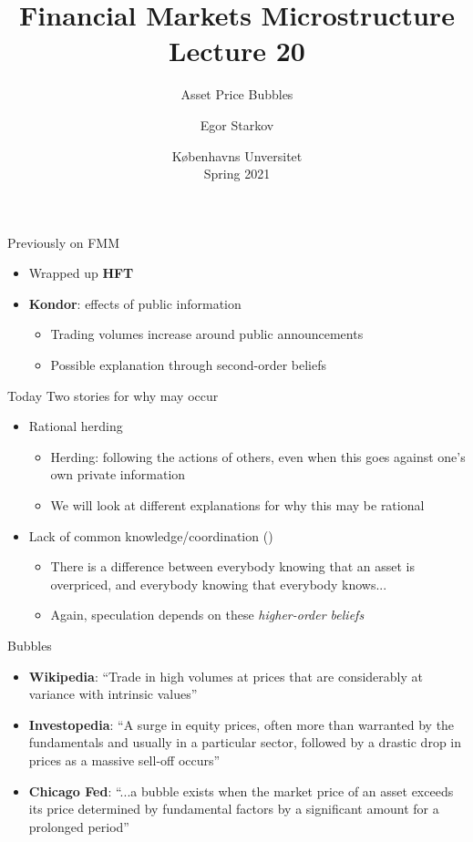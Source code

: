 \documentclass[english,10pt
,aspectratio=169
]{beamer}
\title{Financial Markets Microstructure \\ Lecture 20}
\subtitle{Asset Price Bubbles}
\author{Egor Starkov}
\date{K{\o}benhavns Unversitet \\
	Spring 2021}
\begin{document}
	\frame[plain]{\titlepage}



\begin{frame}{Previously on FMM}
	\begin{itemize}
		\item Wrapped up \textbf{HFT}
		\item \textbf{Kondor}: effects of public information
		\begin{itemize}
			\item Trading volumes increase around public announcements
			\item Possible explanation through second-order beliefs
		\end{itemize}
	\end{itemize}
\end{frame}	


\begin{frame}{Today}
	Two stories for why  may occur
	\begin{itemize}
		\item Rational herding
		\begin{itemize}
			\item Herding: following the actions of others, even when this goes against one's own private information
			\item We will look at different explanations for why this may be rational
		\end{itemize}
		\item Lack of common knowledge/coordination (\cite{abreu_bubbles_2003})
		\begin{itemize}
			\item There is a difference between everybody knowing that an asset is overpriced, and everybody knowing that everybody knows...
			\item Again, speculation depends on these \emph{higher-order beliefs}
		\end{itemize}
	\end{itemize}
\end{frame}


\begin{frame}{Bubbles}
	\begin{itemize}
		\item \textbf{Wikipedia}: ``Trade in high volumes at prices that are considerably at variance with intrinsic values''
		\item \textbf{Investopedia}: ``A surge in equity prices, often more than warranted by the fundamentals and usually in a particular sector, followed by a drastic drop in prices as a massive sell-off occurs''
		\item \textbf{Chicago Fed}: ``...a bubble exists when the market price of an asset exceeds its price determined by fundamental factors by a significant amount for a prolonged period''
	\end{itemize}
\end{frame}
\end{document}
